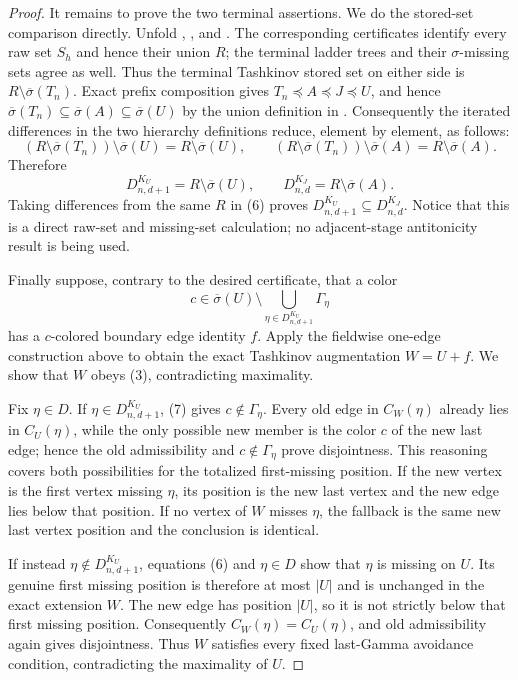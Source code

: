 \begin{proof}
It remains to prove the two terminal assertions.  We do the stored-set
comparison directly.  Unfold ,
, and
.  The corresponding certificates
identify every raw set $S_h$ and hence their union $R$; the terminal ladder
trees and their $\sigma$-missing sets agree as well.  Thus the terminal
Tashkinov stored set on either side is
$R\setminus\overline\sigma(T_n)$.  Exact prefix composition gives
$T_n\preccurlyeq A\preccurlyeq J\preccurlyeq U$, and hence
$\overline\sigma(T_n)\subseteq\overline\sigma(A)
\subseteq\overline\sigma(U)$ by the union definition in
.  Consequently the iterated differences in
the two hierarchy definitions reduce, element by element, as follows:
\[
 (R\setminus\overline\sigma(T_n))
       \setminus\overline\sigma(U)=R\setminus\overline\sigma(U),
 \qquad
 (R\setminus\overline\sigma(T_n))
       \setminus\overline\sigma(A)=R\setminus\overline\sigma(A).
\]
Therefore
\[
 D^{K_U}_{n,d+1}=R\setminus\overline\sigma(U),\qquad
 D^{K_J}_{n,d}=R\setminus\overline\sigma(A).             \tag{6}
\]
Taking differences from the same $R$ in (6) proves
$D^{K_U}_{n,d+1}\subseteq D^{K_J}_{n,d}$.  Notice that this is a direct
raw-set and missing-set calculation; no adjacent-stage antitonicity result
is being used.

Finally suppose, contrary to the desired
 certificate, that a color
\[
 c\in\overline\sigma(U)\setminus
       \bigcup_{\eta\in D^{K_U}_{n,d+1}}\Gamma_\eta       \tag{7}
\]
has a $c$-colored boundary edge identity $f$.  Apply the fieldwise
one-edge construction above to obtain the exact Tashkinov augmentation
$W=U+f$.  We show that $W$ obeys (3), contradicting maximality.

Fix $\eta\in D$.  If $\eta\in D^{K_U}_{n,d+1}$, (7) gives
$c\notin\Gamma_\eta$.  Every old edge in $C_W(\eta)$ already lies in
$C_U(\eta)$, while the only possible new member is the color $c$ of the
new last edge; hence the old admissibility and $c\notin\Gamma_\eta$ prove
disjointness.  This reasoning covers both possibilities for the totalized
first-missing position.  If the new vertex is the first vertex missing
$\eta$, its position is the new last vertex and the new edge lies below
that position.  If no vertex of $W$ misses $\eta$, the fallback is the
same new last vertex position and the conclusion is identical.

If instead $\eta\notin D^{K_U}_{n,d+1}$, equations (6) and $\eta\in D$
show that $\eta$ is missing on $U$.  Its genuine first missing position is
therefore at most $|U|$ and is unchanged in the exact extension $W$.
The new edge has position $|U|$, so it is not strictly below that first
missing position.  Consequently $C_W(\eta)=C_U(\eta)$, and old
admissibility again gives disjointness.  Thus $W$ satisfies every fixed
last-Gamma avoidance condition, contradicting the maximality of $U$.


\end{proof}
